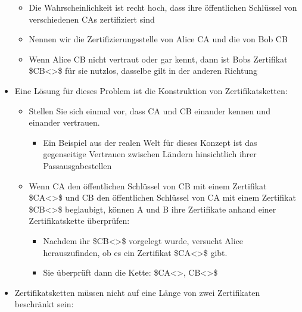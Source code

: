 \documentclass[a4paper]{article}
\begin{document}
\begin{multicols}{3}
\begin{itemize}
              \begin{itemize}
                  \item
                        Die Wahrscheinlichkeit ist recht hoch, dass ihre öffentlichen
                        Schlüssel von verschiedenen CAs zertifiziert sind
                  \item
                        Nennen wir die Zertifizierungsstelle von Alice CA und die von Bob CB
                  \item
                        Wenn Alice CB nicht vertraut oder gar kennt, dann ist Bobs
                        Zertifikat \$CB\textless{}\textgreater\$ für sie nutzlos, dasselbe
                        gilt in der anderen Richtung
              \end{itemize}
        \item
              Eine Lösung für dieses Problem ist die Konstruktion von
              Zertifikatsketten:

              \begin{itemize}
                  \item
                        Stellen Sie sich einmal vor, dass CA und CB einander kennen und
                        einander vertrauen.

                        \begin{itemize}
                            \item
                                  Ein Beispiel aus der realen Welt für dieses Konzept ist das
                                  gegenseitige Vertrauen zwischen Ländern hinsichtlich ihrer
                                  Passausgabestellen
                        \end{itemize}
                  \item
                        Wenn CA den öffentlichen Schlüssel von CB mit einem Zertifikat
                        \$CA\textless{}\textgreater\$ und CB den öffentlichen Schlüssel von
                        CA mit einem Zertifikat \$CB\textless{}\textgreater\$ beglaubigt,
                        können A und B ihre Zertifikate anhand einer Zertifikatskette
                        überprüfen:

                        \begin{itemize}
                            \item
                                  Nachdem ihr \$CB\textless{}\textgreater\$ vorgelegt wurde,
                                  versucht Alice herauszufinden, ob es ein Zertifikat
                                  \$CA\textless{}\textgreater\$ gibt.
                            \item
                                  Sie überprüft dann die Kette: \$CA\textless{}\textgreater,
                                  CB\textless{}\textgreater\$
                        \end{itemize}
              \end{itemize}
        \item
              Zertifikatsketten müssen nicht auf eine Länge von zwei Zertifikaten
              beschränkt sein:


\end{itemize}
\end{multicols}
\end{document}
